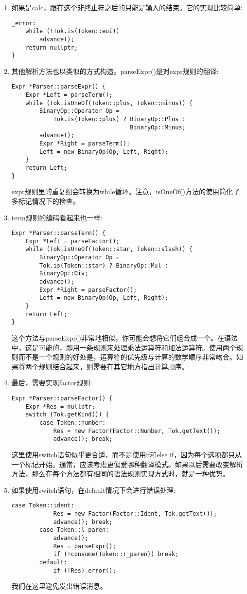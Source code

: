 \begin{enumerate}
\item 如果是calc，跟在这个非终止符之后的只能是输入的结束。它的实现比较简单:
\begin{lstlisting}[caption={}]
_error:
	while (!Tok.is(Token::eoi))
		advance();
	return nullptr;
}
\end{lstlisting}

\item 其他解析方法也以类似的方式构造。parseExpr()是对expr规则的翻译:
\begin{lstlisting}[caption={}]
Expr *Parser::parseExpr() {
	Expr *Left = parseTerm();
	while (Tok.isOneOf(Token::plus, Token::minus)) {
		BinaryOp::Operator Op =
			Tok.is(Token::plus) ? BinaryOp::Plus :
								  BinaryOp::Minus;
		advance();
		Expr *Right = parseTerm();
		Left = new BinaryOp(Op, Left, Right);
	}
	return Left;
}
\end{lstlisting}
expr规则里的重复组会转换为while循环。注意，isOneOf()方法的使用简化了多标记情况下的检查。

\item term规则的编码看起来也一样:
\begin{lstlisting}[caption={}]
Expr *Parser::parseTerm() {
	Expr *Left = parseFactor();
	while (Tok.isOneOf(Token::star, Token::slash)) {
		BinaryOp::Operator Op =
		Tok.is(Token::star) ? BinaryOp::Mul :
		BinaryOp::Div;
		advance();
		Expr *Right = parseFactor();
		Left = new BinaryOp(Op, Left, Right);
	}
	return Left;
}
\end{lstlisting}
这个方法与parseExpr()非常地相似，你可能会想将它们组合成一个。在语法中，这是可能的，即用一条规则来处理乘法运算符和加法运算符。使用两个规则而不是一个规则的好处是，运算符的优先级与计算的数学顺序非常吻合。如果将两个规则结合起来，则需要在其它地方指出计算顺序。

\item 最后，需要实现factor规则:
\begin{lstlisting}[caption={}]
Expr *Parser::parseFactor() {
	Expr *Res = nullptr;
	switch (Tok.getKind()) {
		case Token::number:
			Res = new Factor(Factor::Number, Tok.getText());
			advance(); break;
\end{lstlisting}
这里使用switch语句似乎更合适，而不是使用if和else if，因为每个选项都只从一个标记开始。通常，应该考虑更偏爱哪种翻译模式。如果以后需要改变解析方法，那么在每个方法都有相同的语法规则实现方式时，就是一种优势。

\item 如果使用switch语句，在default情况下会进行错误处理:
\begin{lstlisting}[caption={}]
		case Token::ident:
			Res = new Factor(Factor::Ident, Tok.getText());
			advance(); break;
		case Token::l_paren:
			advance();
			Res = parseExpr();
			if (!consume(Token::r_paren)) break;
		default:
			if (!Res) error();
\end{lstlisting}
我们在这里避免发出错误消息。


\end{enumerate}
